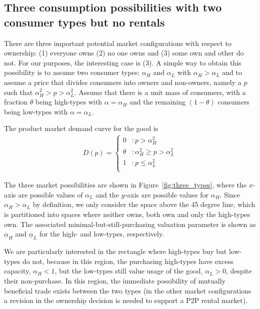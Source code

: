 \documentclass[11pt]{article}
\begin{document}
\subsection{Three consumption possibilities with two consumer types but no rentals} 
There are three important potential market configurations with respect to ownership:
(1) everyone owns (2) no one owns and (3) some own and other do not.
For our purposes, the interesting case is (3).
A simple way to obtain this possibility is to assume two consumer types: $\alpha_H$ and $\alpha_L$ with $\alpha_H > \alpha_L$ and to assume a price that divides consumers into owners and non-owners, namely a $p$ such that $\alpha_H^2 > p > \alpha_L^2$.
Assume that there is a unit mass of consumers, with a fraction $\theta$ being high-types with $\alpha = \alpha_H$ and the remaining $(1-\theta)$ consumers being low-types with $\alpha = \alpha_L$. 

The product market demand curve for the good is 
\begin{align} \label{eq:demand}
   D(p) = \left\{
     \begin{array}{ll}
       0 & : p > \alpha_H^2\\
       \theta & : \alpha_H^2 \ge p > \alpha_L^2  \\
       1 & : p \le \alpha_L^2  \\
     \end{array}
   \right. 
\end{align} 

The three market possibilities are shown in Figure~\ref{fig:three_types}, where the $x$-axis are possible values of $\alpha_L$ and the $y$-axis are possible values for $\alpha_H$. 
Since $\alpha_H > \alpha_L$ by definition, we only consider the space above the 45 degree line, which is partitioned into spaces where neither owns, both own and only the high-types own. 
The associated minimal-but-still-purchasing valuation parameter is shown as $\underline{\alpha}_H$ and $\underline{\alpha}_L$ for the high- and low-types, respectively. 

We are particularly interested in the rectangle where high-types buy but low-types do not, because in this region, the purchasing high-types have excess capacity, $\alpha_H < 1$, but the low-types still value usage of the good, $\alpha_L > 0$, despite their non-purchase. 
In this region, the immediate possibility of mutually beneficial trade exists between the two types (in the other market configurations a revision in the ownership decision is needed to support a P2P rental market). 
\end{document}
